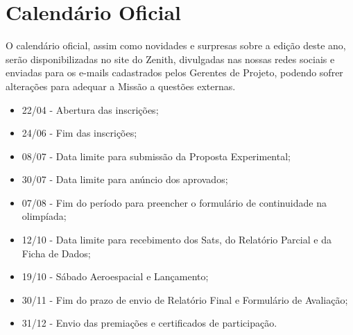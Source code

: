 \section{Calendário Oficial} 
    O calendário oficial, assim como novidades e surpresas sobre a edição deste ano, serão disponibilizadas no site do Zenith, divulgadas nas nossas redes sociais e enviadas para os e-mails cadastrados pelos Gerentes de Projeto, podendo sofrer alterações para adequar a Missão a questões externas. 
    \begin{itemize}
        \item 22/04 - Abertura das inscrições;
        \item 24/06 - Fim das inscrições;
        \item 08/07 - Data limite para submissão da Proposta Experimental;
        \item 30/07 - Data limite para anúncio dos aprovados;
        \item 07/08 - Fim do período para preencher o formulário de continuidade na olimpíada;
        \item 12/10 - Data limite para recebimento dos Sats, do Relatório Parcial e da Ficha de Dados;
        \item 19/10 - Sábado Aeroespacial e Lançamento;
        \item 30/11 - Fim do prazo de envio de Relatório Final e Formulário de Avaliação;
        \item 31/12 - Envio das premiações e certificados de participação.
    \end{itemize}
